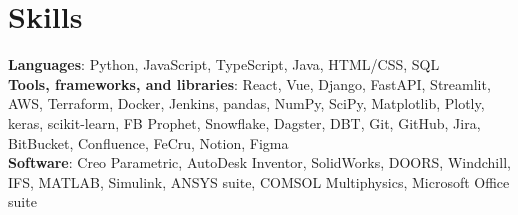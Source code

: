 \documentclass[letterpaper,11pt]{article}
\begin{document}
\section{Skills}
\begin{itemize}[leftmargin=0.15in, label={}]
  \small{\item{
        \textbf{Languages}{:
          Python,
          JavaScript,
          TypeScript,
          Java,
          HTML/CSS,
          SQL
        } \\
        \textbf{Tools, frameworks, and libraries}{:
          React,
          Vue,
          Django,
          FastAPI,
          Streamlit,
          AWS,
          Terraform,
          Docker,
          Jenkins,
          pandas,
          NumPy,
          SciPy,
          Matplotlib,
          Plotly,
          keras,
          scikit-learn,
          FB Prophet,
          Snowflake,
          Dagster,
          DBT,
          Git,
          GitHub,
          Jira,
          BitBucket,
          Confluence,
          FeCru,
          Notion,
          Figma
        } \\
        \textbf{Software}{:
          Creo Parametric,
          AutoDesk Inventor,
          SolidWorks,
          DOORS,
          Windchill,
          IFS,
          MATLAB,
          Simulink,
          ANSYS suite,
          COMSOL Multiphysics,
          Microsoft Office suite
        } \\
        }}
\end{itemize}

\end{document}
